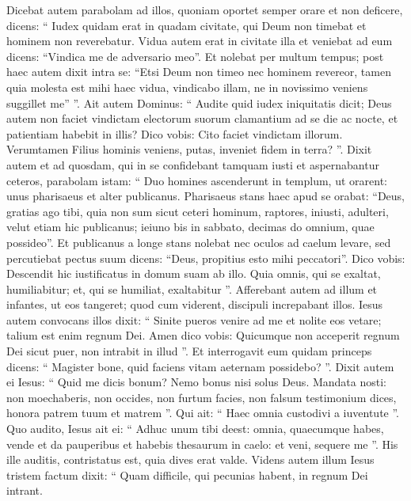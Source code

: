 \begin{biblechapter}
\begin{biblechapter}
\begin{biblechapter}
\begin{biblechapter}
\begin{biblechapter}
\begin{biblechapter}
\begin{biblechapter}
\begin{biblechapter}
\begin{biblechapter}
\begin{biblechapter}
\begin{biblechapter}
\begin{biblechapter}
\begin{biblechapter}
\begin{biblechapter}
\begin{biblechapter}
\begin{biblechapter}
\begin{biblechapter}
\begin{biblechapter}
\verse Dicebat autem parabolam ad illos, quoniam oportet semper orare et non deficere, 
\verse dicens: “ Iudex quidam erat in quadam civitate, qui Deum non timebat et hominem non reverebatur. 
\verse Vidua autem erat in civitate illa et veniebat ad eum dicens: “Vindica me de adversario meo”. 
\verse Et nolebat per multum tempus; post haec autem dixit intra se: “Etsi Deum non timeo nec hominem revereor, 
\verse tamen quia molesta est mihi haec vidua, vindicabo illam, ne in novissimo veniens suggillet me” ”. 
\verse Ait autem Dominus: “ Audite quid iudex iniquitatis dicit; 
\verse Deus autem non faciet vindictam electorum suorum clamantium ad se die ac nocte, et patientiam habebit in illis? 
\verse Dico vobis: Cito faciet vindictam illorum. Verumtamen Filius hominis veniens, putas, inveniet fidem in terra? ”.
 \verse Dixit autem et ad quosdam, qui in se confidebant tamquam iusti et aspernabantur ceteros, parabolam istam: 
\verse “ Duo homines ascenderunt in templum, ut orarent: unus pharisaeus et alter publicanus. 
\verse Pharisaeus stans haec apud se orabat: “Deus, gratias ago tibi, quia non sum sicut ceteri hominum, raptores, iniusti, adulteri, velut etiam hic publicanus; 
\verse ieiuno bis in sabbato, decimas do omnium, quae possideo”. 
\verse Et publicanus a longe stans nolebat nec oculos ad caelum levare, sed percutiebat pectus suum dicens: “Deus, propitius esto mihi peccatori”. 
\verse Dico vobis: Descendit hic iustificatus in domum suam ab illo. Quia omnis, qui se exaltat, humiliabitur; et, qui se humiliat, exaltabitur ”.
 \verse Afferebant autem ad illum et infantes, ut eos tangeret; quod cum viderent, discipuli increpabant illos. 
\verse Iesus autem convocans illos dixit: “ Sinite pueros venire ad me et nolite eos vetare; talium est enim regnum Dei. 
\verse Amen dico vobis: Quicumque non acceperit regnum Dei sicut puer, non intrabit in illud ”.
 \verse Et interrogavit eum quidam princeps dicens: “ Magister bone, quid faciens vitam aeternam possidebo? ”. 
\verse Dixit autem ei Iesus: “ Quid me dicis bonum? Nemo bonus nisi solus Deus. 
\verse Mandata nosti: non moechaberis, non occides, non furtum facies, non falsum testimonium dices, honora patrem tuum et matrem ”. 
\verse Qui ait: “ Haec omnia custodivi a iuventute ”. 
\verse Quo audito, Iesus ait ei: “ Adhuc unum tibi deest: omnia, quaecumque habes, vende et da pauperibus et habebis thesaurum in caelo: et veni, sequere me ”. 
\verse His ille auditis, contristatus est, quia dives erat valde. 
\verse Videns autem illum Iesus tristem factum dixit: “ Quam difficile, qui pecunias habent, in regnum Dei intrant. 

\end{biblechapter}
\end{biblechapter}
\end{biblechapter}
\end{biblechapter}
\end{biblechapter}
\end{biblechapter}
\end{biblechapter}
\end{biblechapter}
\end{biblechapter}
\end{biblechapter}
\end{biblechapter}
\end{biblechapter}
\end{biblechapter}
\end{biblechapter}
\end{biblechapter}
\end{biblechapter}
\end{biblechapter}
\end{biblechapter}
